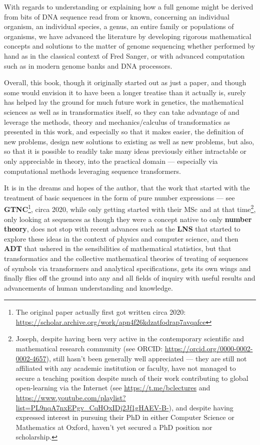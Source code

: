\documentclass[a4paper, 18pt]{book} %
\begin{document}
With regards to understanding or explaining how a full genome might be derived from bits of DNA sequence read from or known, concerning an individual organism, an individual species, a genus, an entire family or populations of organisms, we have advanced the literature by developing rigorous mathematical concepts and solutions to the matter of genome sequencing whether performed by hand as in the classical context of Fred Sanger, or with advanced computation such as in modern genome banks and DNA processors. 

Overall, this book, though it originally started out as just a paper, and though some would envision it to have been a longer treatise than it actually is, surely has helped lay the ground for much future work in genetics, the mathematical sciences as well as in transformatics itself, so they can take advantage of and leverage the methods, theory and mechanics/calculus of transformatics as presented in this work, and especially so that it makes easier, the definition of new problems, design new solutions to existing as well as new problems, but also, so that it is possible to readily take many ideas previously either intractable or only appreciable in theory, into the practical domain --- especially via computational methods leveraging sequence transformers.

It is in the dreams and hopes of the author, that the work that started with the treatment of basic sequences in the form of pure number expressions --- see \textbf{GTNC}\footnote{The original paper actually first got written circa 2020: \url{https://scholar.archive.org/work/apn4f26kdzatfodrap7avqafce}}\cite{Lutalo2024gtnc}, circa 2020, while only getting started with their MSc and at that time\footnote{Joseph, despite having been very active in the contemporary scientific and mathematical research community (see ORCID: \url{https://orcid.org/0000-0002-0002-4657}), still hasn't been generally well appreciated --- they are still not affiliated with any academic institution or faculty, have not managed to secure a teaching position despite much of their work contributing to global open-learning via the Internet (see \url{https://t.me/bclectures} and \url{https://www.youtube.com/playlist?list=PL9nqA7nxEPgv_CqHOxIDj2Jf1gHAEV-B-}), and despite having expressed interest in pursuing their PhD in either Computer Science or Mathematics at Oxford\cite{lutalo_2025_sop}, haven't yet secured a PhD position nor scholarship.}, only looking at sequences as though they were a concept native to only \textbf{number theory}, does not stop with recent advances such as the \textbf{LNS}\cite{lnspaper} that started to explore these ideas in the context of physics and computer science, and then \textbf{ADT} that ushered in the sensibilities of mathematical statistics, but that transformatics and the collective mathematical theories of treating of sequences of symbols via transformers and analytical specifications, gets its own wings and finally flies off the ground into any and all fields of inquiry with useful results and advancements of human understanding and knowledge. 
\end{document}
